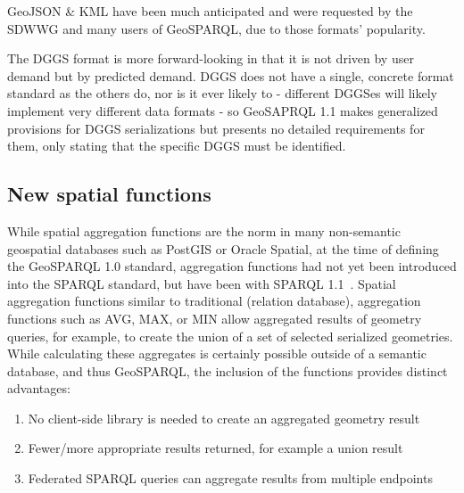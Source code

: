 \documentclass[runningheads]{llncs}
\begin{document}
GeoJSON \& KML have been much anticipated and were requested by the SDWWG and many users of 
GeoSPARQL, due to those formats' popularity.

The DGGS format is more forward-looking in that it is not driven by user demand but by predicted demand.
DGGS does not have a single, concrete format standard as the others do, nor is it ever likely to - different DGGSes will 
likely implement very different data formats - so GeoSAPRQL 1.1 makes generalized provisions for DGGS serializations but 
presents no detailed requirements for them, only stating that the specific DGGS must be identified.

\subsection{New spatial functions}\label{sec:newfunctions}
While spatial aggregation functions are the norm in many non-semantic geospatial databases such as PostGIS or Oracle Spatial, 
at the time of defining the GeoSPARQL 1.0 standard, aggregation functions had not yet been introduced into the SPARQL standard,
but have been with SPARQL 1.1~\cite{w3c_sparql_working_group_sparql_2013}. Spatial aggregation functions 
similar to traditional (relation database), aggregation functions such as AVG, MAX, or MIN allow aggregated results of geometry 
queries, for example, to create the union of a set of selected serialized geometries. While calculating these aggregates is 
certainly possible outside of a semantic database, and thus GeoSPARQL, the inclusion of the functions provides distinct advantages:

\begin{enumerate}
    \item No client-side library is needed to create an aggregated geometry result
    \item Fewer/more appropriate results returned, for example a union result
    \item Federated SPARQL queries can aggregate results from multiple endpoints
\end{enumerate}
\end{document}
